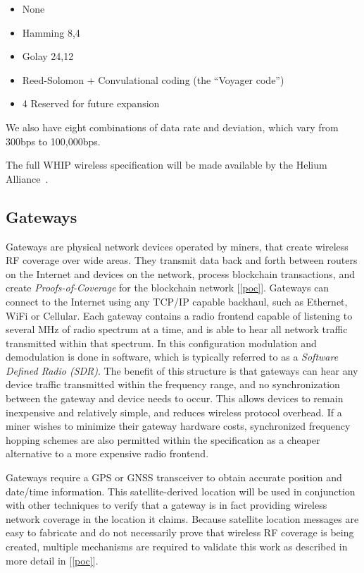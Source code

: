 \documentclass[letterpaper,11pt]{article}
\begin{document}
\begin{itemize}
	\item None
	\item Hamming 8,4
	\item Golay 24,12
	\item Reed-Solomon + Convulational coding (the ``Voyager code'')
	\item 4 Reserved for future expansion
\end{itemize}

We also have eight combinations of data rate and deviation, which vary from 300bps to 100,000bps.\newline

The full WHIP wireless specification will be made available by the Helium Alliance~\cite{alliance}.

\subsection{Gateways} \label{gateways}

Gateways are physical network devices operated by miners, that create wireless RF coverage over wide areas. They transmit data back and forth between routers on the Internet and devices on the network, process blockchain transactions, and create \emph{Proofs-of-Coverage} for the blockchain network [\ref{poc}]. Gateways can connect to the Internet using any TCP/IP capable backhaul, such as Ethernet, WiFi or Cellular. Each gateway contains a radio frontend capable of listening to several MHz of radio spectrum at a time, and is able to hear all network traffic transmitted within that spectrum. In this configuration modulation and demodulation is done in software, which is typically referred to as a \emph{Software Defined Radio (SDR)}. The benefit of this structure is that gateways can hear any device traffic transmitted within the frequency range, and no synchronization between the gateway and device needs to occur. This allows devices to remain inexpensive and relatively simple, and reduces wireless protocol overhead. If a miner wishes to minimize their gateway hardware costs, synchronized frequency hopping schemes are also permitted within the specification as a cheaper alternative to a more expensive radio frontend.\newline

Gateways require a GPS or GNSS transceiver to obtain accurate position and date/time information. This satellite-derived location will be used in conjunction with other techniques to verify that a gateway is in fact providing wireless network coverage in the location it claims. Because satellite location messages are easy to fabricate and do not necessarily prove that wireless RF coverage is being created, multiple mechanisms are required to validate this work as described in more detail in [\ref{poc}].\newline
\end{document}
